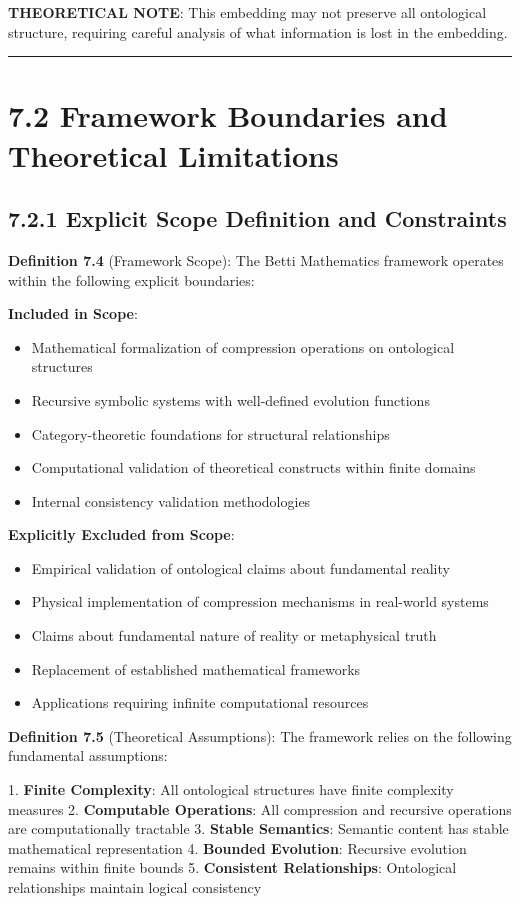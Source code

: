 \textbf{THEORETICAL NOTE}: This embedding may not preserve all ontological structure, requiring careful analysis of what information is lost in the embedding.

\hrule

\section{7.2 Framework Boundaries and Theoretical Limitations}

\subsection{7.2.1 Explicit Scope Definition and Constraints}

\textbf{Definition 7.4} (Framework Scope): The Betti Mathematics framework operates within the following explicit boundaries:

\textbf{Included in Scope}:
\begin{itemize}
\item Mathematical formalization of compression operations on ontological structures
\item Recursive symbolic systems with well-defined evolution functions
\item Category-theoretic foundations for structural relationships
\item Computational validation of theoretical constructs within finite domains
\item Internal consistency validation methodologies
\end{itemize}

\textbf{Explicitly Excluded from Scope}:
\begin{itemize}
\item Empirical validation of ontological claims about fundamental reality
\item Physical implementation of compression mechanisms in real-world systems
\item Claims about fundamental nature of reality or metaphysical truth
\item Replacement of established mathematical frameworks
\item Applications requiring infinite computational resources
\end{itemize}

\textbf{Definition 7.5} (Theoretical Assumptions): The framework relies on the following fundamental assumptions:

1. \textbf{Finite Complexity}: All ontological structures have finite complexity measures
2. \textbf{Computable Operations}: All compression and recursive operations are computationally tractable
3. \textbf{Stable Semantics}: Semantic content has stable mathematical representation
4. \textbf{Bounded Evolution}: Recursive evolution remains within finite bounds
5. \textbf{Consistent Relationships}: Ontological relationships maintain logical consistency

